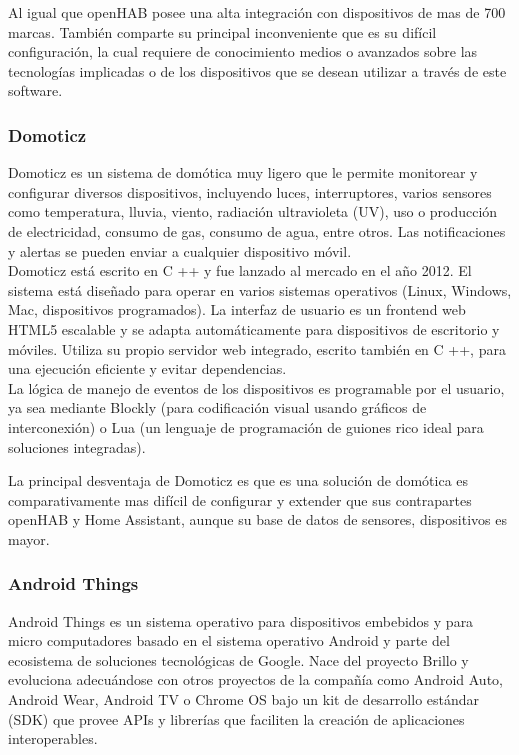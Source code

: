 Al igual que openHAB posee una alta integración con dispositivos de mas de 700 marcas.\cite{homeAssistant2} También comparte su principal inconveniente que es su difícil configuración, la cual requiere de conocimiento medios o avanzados sobre las tecnologías implicadas o de los dispositivos que se desean utilizar a través de este software. 

\subsubsection{Domoticz}
Domoticz es un sistema de domótica muy ligero que le permite monitorear y configurar diversos dispositivos, incluyendo luces, interruptores, varios sensores como temperatura, lluvia, viento, radiación ultravioleta (UV), uso o producción de electricidad, consumo de gas, consumo de agua, entre otros. Las notificaciones  y alertas se pueden enviar a cualquier dispositivo móvil.\cite{domoticzwiki}\\

Domoticz está escrito en C ++ y fue lanzado al mercado en el año 2012. El sistema está diseñado para operar en varios sistemas operativos (Linux, Windows, Mac, dispositivos programados). La interfaz de usuario es un frontend web HTML5 escalable y se adapta automáticamente para dispositivos de escritorio y móviles.\cite{domoticz} Utiliza su propio servidor web integrado, escrito también en C ++, para una ejecución eficiente y evitar dependencias.\\

La lógica de manejo de eventos de los dispositivos es programable por el usuario, ya sea mediante Blockly (para codificación visual usando gráficos de interconexión) o Lua (un lenguaje de programación de guiones rico ideal para soluciones integradas).

La principal desventaja de Domoticz es que es una solución de domótica es comparativamente mas difícil de configurar y extender que sus contrapartes openHAB y Home Assistant, aunque su base de datos de sensores, dispositivos es mayor.

\subsubsection{Android Things}
Android Things es un sistema operativo para dispositivos embebidos y para micro computadores basado en el sistema operativo Android y parte del ecosistema de soluciones tecnológicas de Google. Nace del proyecto Brillo y evoluciona adecuándose con otros proyectos de la compañía como Android Auto, Android Wear, Android  TV o Chrome OS bajo un kit de desarrollo estándar (SDK)\cite{AndroidThings} que provee APIs y librerías que faciliten la creación de aplicaciones interoperables.\\

